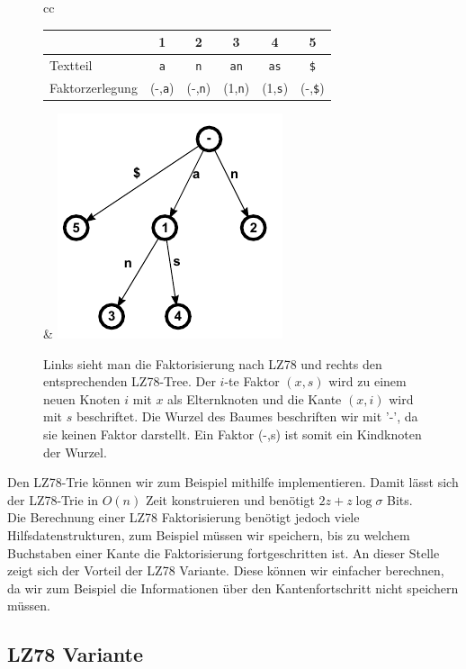 \documentclass[a4paper,11pt]{scrartcl}%
\theoremstyle{change}
\theoremstyle{nonumberplain}
\theoremstyle{change}
\theoremstyle{nonumberplain}
\theoremstyle{change}
\theoremstyle{nonumberplain}
\begin{document}
 	
	\begin{figure}[h]
	\begin{tabular}[t]{cc}
		\begin{tabular}[b]{l c c c c c}\hline
			& 1 & 2 & 3 & 4 & 5 \\ \hline
		   Textteil & \texttt{a} & \texttt{n} & \texttt{an} & \texttt{as} & \texttt{\$}\\ \hline
		   Faktorzerlegung & (-,\texttt{a}) & (-,\texttt{n}) & (1,\texttt{n}) & (1,\texttt{s}) &  (-,\texttt{\$})\\ \hline
		\end{tabular} & \includegraphics{./pics/ananas_LZ78Tree}
	\end{tabular}
	\caption{Links sieht man die Faktorisierung nach LZ78 und rechts den entsprechenden LZ78-Tree. Der $i$-te Faktor $(x,s)$ wird zu einem neuen Knoten $i$ mit $x$ als Elternknoten und die Kante $(x,i)$ wird mit $s$ beschriftet. Die Wurzel des Baumes beschriften wir mit '-', da sie keinen Faktor darstellt. Ein Faktor (-,s) ist somit ein Kindknoten der Wurzel.}
	\label{fig:lz78}
	\end{figure}

Den LZ78-Trie können wir zum Beispiel mithilfe \cite[Kapitel 6.3]{cics}	implementieren. Damit lässt sich der LZ78-Trie in $O(n)$ Zeit konstruieren und benötigt $2z + z \log \sigma$ Bits.\\
Die Berechnung einer LZ78 Faktorisierung benötigt jedoch viele Hilfsdatenstrukturen, zum Beispiel müssen wir speichern, bis zu welchem Buchstaben einer Kante die Faktorisierung fortgeschritten ist. An dieser Stelle zeigt sich der Vorteil der LZ78 Variante. Diese können wir einfacher berechnen, da wir zum Beispiel die Informationen über den Kantenfortschritt nicht speichern müssen. 
	

\subsection{LZ78 Variante}\label{LZ78 Variante}
\end{document}
